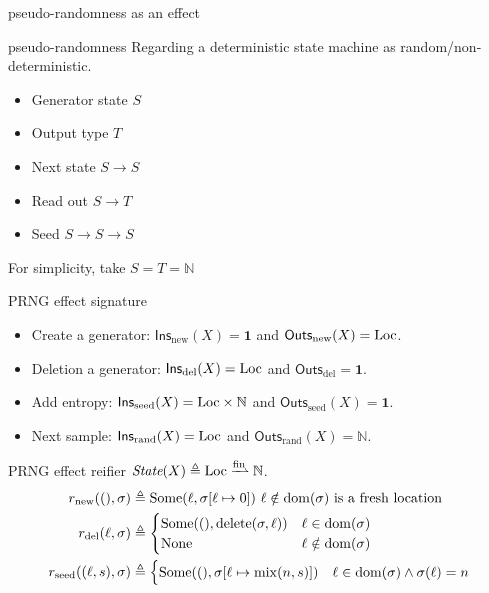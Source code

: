 \documentclass[8pt]{beamer}
\newcommand{\Ins}{\mathsf{Ins}}
\newcommand{\Outs}{\mathsf{Outs}}
\newcommand{\new}{\mathrm{new}}
\newcommand{\del}{\mathrm{del}}
\newcommand{\seed}{\mathrm{seed}}
\newcommand{\rand}{\mathrm{rand}}
\newcommand{\mix}{\mathrm{mix}}
\begin{document}
  \begin{frame}[allowframebreaks]{pseudo-randomness as an effect}
    \begin{block}{pseudo-randomness}
      Regarding a deterministic state machine as random/non-deterministic.
      \begin{itemize}
        \item Generator state \(S\)
        \item Output type \(T\)
        \item Next state \(S \to S\)
        \item Read out \(S \to T\)
        \item Seed \(S \to S \to S\)
      \end{itemize}
      For simplicity, take \(S = T = \mathbb{N}\)
    \end{block}
    \begin{block}{PRNG effect signature}
      \begin{itemize}
        \item Create a generator: \(\Ins_{\new}(X) = \mathbf{1}\) and \(\Outs_{\new}(X) = \iLoc\).
        \item Deletion a generator: \(\Ins_{\del}(X) = \iLoc\) and \(\Outs_{\del} = \mathbf{1}\).
        \item Add entropy: \(\Ins_{\seed}(X) = \iLoc \times \mathbb{N}\) and \(\Outs_{\seed}(X) = \mathbf{1}\).
        \item Next sample: \(\Ins_{\rand}(X) = \iLoc\) and \(\Outs_{\rand}(X) = \mathbb{N}\).
      \end{itemize}
    \end{block}
    \framebreak
    \begin{block}{PRNG effect reifier}
      \(\State(X) \eqdef \iLoc \fpfn \mathbb{N}\).
      \begin{align*}
        r_{\new}((), \sigma) & \eqdef \Some(\ell, \sigma[\ell\mapsto 0]) \text{ \(\ell \notin \dom(\sigma)\) is a fresh location}\\
        r_{\del}(\ell,\sigma) & \eqdef \begin{cases}
          \Some((), \mathrm{delete}(\sigma,\ell)) & \ell \in \dom(\sigma)\\
          \None & \ell \notin \dom(\sigma)\\
        \end{cases} \\
          r_{\seed}((\ell,s), \sigma) & \eqdef \begin{cases}
            \Some((), \sigma[\ell\mapsto \mix(n,s)]) & \ell \in \dom(\sigma) \land \sigma(\ell) = n\\

\end{cases}
\end{align*}
\end{block}
\end{frame}
\end{document}
